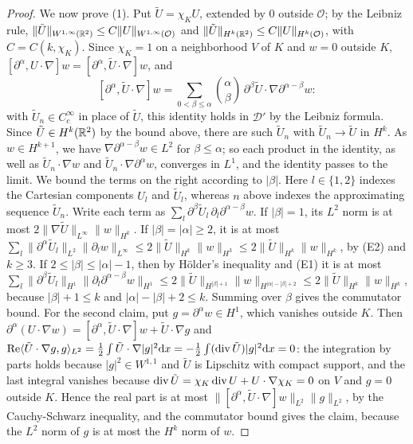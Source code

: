 \begin{proof}
We now prove (1). Put $\tilde U=\chi_KU$, extended by $0$ outside $\mathcal O$; by the
Leibniz rule, $\|\tilde U\|_{W^{1,\infty}(\mathbb{R}^2)}\le C\|U\|_{W^{1,\infty}(\mathcal O)}$ and
$\|\tilde U\|_{H^k(\mathbb{R}^2)}\le C\|U\|_{H^k(\mathcal O)}$, with $C=C(k,\chi_K)$. Since
$\chi_K=1$ on a neighborhood $V$ of $K$ and $w=0$ outside $K$,
$[\partial^\alpha,U\cdot\nabla]w=[\partial^\alpha,\tilde U\cdot\nabla]w$, and
\[
[\partial^\alpha,\tilde U\cdot\nabla]w=\sum_{0<\beta\le\alpha}\binom\alpha\beta\,
\partial^\beta\tilde U\cdot\nabla\partial^{\alpha-\beta}w :
\]
with $\tilde U_n\in C_c^\infty$ in place of
$\tilde U$, this identity holds in $\mathcal D'$ by the Leibniz formula. Since
$\tilde U\in H^k(\mathbb{R}^2)$ by the bound above, there are such $\tilde U_n$ with
$\tilde U_n\to\tilde U$ in $H^k$. As $w\in H^{k+1}$, we have
$\nabla\partial^{\alpha-\beta}w\in L^2$ for $\beta\le\alpha$; so each product in
the identity, as
well as $\tilde U_n\cdot\nabla w$ and $\tilde U_n\cdot\nabla\partial^\alpha w$,
converges in $L^1$, and the identity passes to the limit. We bound the terms on
the right according to $|\beta|$. Here $l\in\{1,2\}$ indexes the Cartesian
components $U_l$ and $\tilde U_l$, whereas $n$ above indexes the approximating
sequence $\tilde U_n$. Write each term as
$\sum_l\partial^\beta\tilde U_l\,\partial_l\partial^{\alpha-\beta}w$. If $|\beta|=1$,
its $L^2$ norm is at most $2\|\nabla\tilde U\|_{L^\infty}\|w\|_{H^k}$. If
$|\beta|=|\alpha|\ge2$, it is at most
$\sum_l\|\partial^\alpha\tilde U_l\|_{L^2}\|\partial_lw\|_{L^\infty}\le2\|\tilde U\|_{H^k}\|w\|_{H^3}
\le2\|\tilde U\|_{H^k}\|w\|_{H^k}$, by (E2) and $k\ge3$. If
$2\le|\beta|\le|\alpha|-1$, then by H\"older's inequality and (E1) it is at most
$\sum_l\|\partial^\beta\tilde U_l\|_{H^1}\|\partial_l\partial^{\alpha-\beta}w\|_{H^1}
\le2\|\tilde U\|_{H^{|\beta|+1}}\|w\|_{H^{|\alpha|-|\beta|+2}}\le2\|\tilde U\|_{H^k}\|w\|_{H^k}$,
because $|\beta|+1\le k$ and $|\alpha|-|\beta|+2\le k$. Summing over $\beta$ gives
the commutator bound. For the second claim, put $g=\partial^\alpha w\in H^1$,
which vanishes outside $K$. Then
$\partial^\alpha(U\cdot\nabla w)=[\partial^\alpha,\tilde U\cdot\nabla]w+\tilde U\cdot\nabla g$
and
$\Re\langle\tilde U\cdot\nabla g,g\rangle_{L^2}=\frac12\int\tilde U\cdot\nabla|g|^2\dd x
=-\frac12\int(\operatorname{div}\tilde U)|g|^2\dd x=0$:
the integration by parts holds because $|g|^2\in W^{1,1}$ and $\tilde U$ is
Lipschitz with compact support, and the last integral vanishes because
$\operatorname{div}\tilde U=\chi_K\operatorname{div} U+U\cdot\nabla\chi_K=0$ on $V$ and $g=0$ outside $K$.
Hence the real part is at most
$\|[\partial^\alpha,\tilde U\cdot\nabla]w\|_{L^2}\|g\|_{L^2}$, by the
Cauchy-Schwarz inequality, and the commutator bound gives the claim, because
the $L^2$ norm of $g$ is at most the $H^k$ norm of $w$.


\end{proof}
